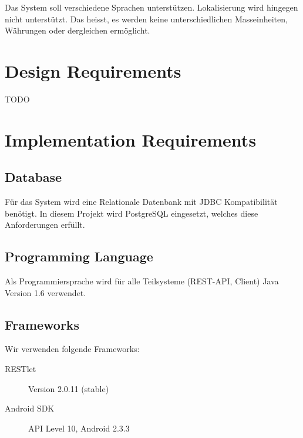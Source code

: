 \documentclass[10pt,a4paper]{scrartcl}
\begin{document}
	Das System soll verschiedene Sprachen unterstützen. Lokalisierung wird hingegen nicht unterstützt. Das heisst, es werden keine unterschiedlichen Masseinheiten, Währungen oder dergleichen ermöglicht.


\section{Design Requirements}

TODO


\section{Implementation Requirements}

	\subsection{Database}

	Für das System wird eine Relationale Datenbank mit JDBC Kompatibilität benötigt.
	In diesem Projekt wird PostgreSQL eingesetzt, welches diese Anforderungen erfüllt.

	\subsection{Programming Language}

	Als Programmiersprache wird für alle Teilsysteme (REST-API, Client) Java Version 1.6 verwendet.

	\subsection{Frameworks}

	Wir verwenden folgende Frameworks:

	\begin{description}
		\item[RESTlet] Version 2.0.11 (stable)
		\item[Android SDK] API Level 10, Android 2.3.3 
	\end{description}
\end{document}
